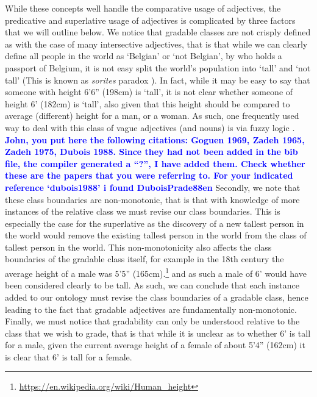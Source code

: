 \documentclass[11pt]{article}
\begin{document}
While these concepts well handle the comparative usage of adjectives, the 
predicative and superlative usage of adjectives is complicated by three factors
that we will outline below. We notice that gradable classes are not 
crisply defined as with the case of many intersective adjectives, that is that 
while we can clearly define all people in the world as `Belgian' or 
`not Belgian', by who holds a passport of Belgium, it is not easy 
split the world's population into `tall' and `not tall' (This is known as \emph{sorites} paradox \cite{Bennett06kr}).
In fact, while it may 
be easy to say that someone with height 6'6'' (198cm) is `tall', it is not clear 
whether someone of height 6' (182cm) is `tall', also given that this height should be compared to average (different)
height for a man, or a woman. 
As such, one frequently used way to deal with this class of vague adjectives (and nouns) is via fuzzy logic \cite{Goguen1969fuzzy,Zadeh1975fuzzy,Zadeh1965fuzzy,DuboisPrade88en,Bennett06kr}.
\textbf{\textcolor{blue}{John, you put here the following citations: Goguen 1969, Zadeh 1965, Zadeh 1975, Dubois 1988. Since they had not been added in the bib file, the compiler generated a ``?'', I have added them. Check whether these are the papers that you were referring to. For your indicated reference `dubois1988' i found DuboisPrade88en}}
Secondly, we note that these class boundaries are 
non-monotonic, that is that with knowledge of more instances of the relative 
class we must revise our class boundaries. This is especially the case for the
superlative as the discovery of a new tallest person in the world would remove 
the existing tallest person in the world from the class of tallest person in the 
world. This non-monotonicity also affects the class boundaries of the gradable 
class itself, for example in the 18th century the average height of a male was 
5'5'' (165cm).\footnote{\url{https://en.wikipedia.org/wiki/Human_height}}
and as such a male of 6' would have been considered clearly to be 
tall. As such, we can conclude that each instance added to our ontology must 
revise the class boundaries of a gradable class, hence leading to the fact that 
gradable adjectives are fundamentally non-monotonic. Finally, we must notice 
that gradability can only be understood relative to the class that we wish to 
grade, that is that while it is unclear as to whether 6' is tall for a male, 
given the current average height of a female of about 5'4'' (162cm) it is clear 
that 6' is tall for a female.
\end{document}
